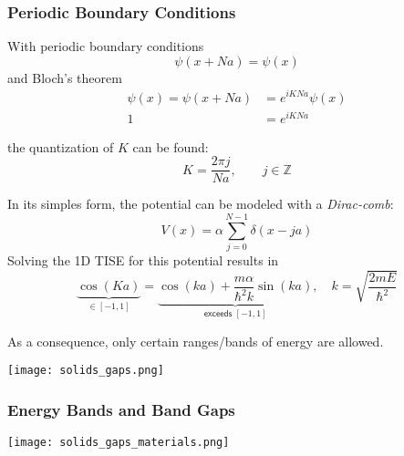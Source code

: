 \subsubsection{Periodic Boundary Conditions}
With periodic boundary conditions
\noindent\begin{equation*}
    \psi(x+Na) = \psi(x)
\end{equation*}
and Bloch's theorem
\noindent\begin{align*}
    \psi(x) = \psi(x+Na) & = e^{iKNa}\psi(x) \\
    1                    & =e^{iKNa}
\end{align*}

the quantization of $K$ can be found:
\noindent\begin{equation*}
    K=\frac{2\pi j}{Na}, \qquad j\in \mathbb{Z}
\end{equation*}


In its simples form, the potential can be modeled with a \textit{Dirac-comb}:
\noindent\begin{equation*}
    V(x)=\alpha\sum_{j=0}^{N-1}\delta(x-ja)
\end{equation*}
Solving the 1D TISE for this potential results in
\noindent\begin{equation*}
    \underbrace{\cos(Ka)}_{\in [-1,1]} = \underbrace{\cos(ka) + \frac{m\alpha}{\hbar^2 k}\sin(ka)}_{\textsf{exceeds }[-1,1]}, \quad k=\sqrt{\frac{2mE}{\hbar^2}}
\end{equation*}

As a consequence, only certain ranges/bands of energy are allowed.
\begin{center}
    \texttt{[image: solids\_gaps.png]}
\end{center}

\subsubsection{Energy Bands and Band Gaps}

\begin{center}
    \texttt{[image: solids\_gaps\_materials.png]}
\end{center}